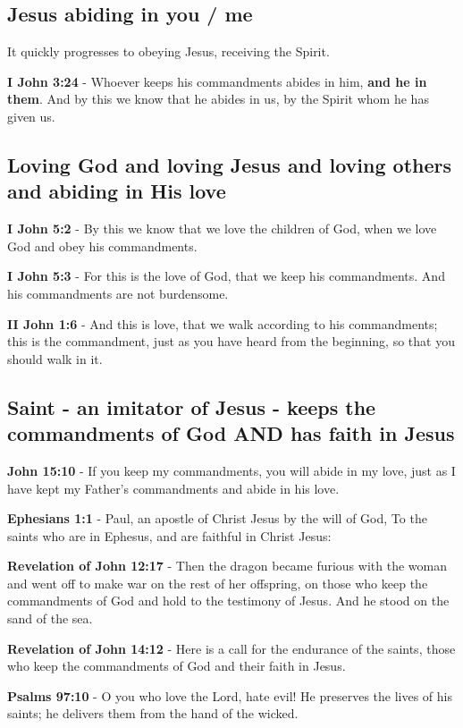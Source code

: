 \documentclass[11pt]{article}
\begin{document}
\subsection{Jesus abiding in \textbf{you} / \textbf{me}}
\label{sec:org439c29e}
It quickly progresses to obeying Jesus, receiving the Spirit.

\textbf{I John 3:24} - Whoever keeps his commandments abides in him, \textbf{and he in them}. And by this we know that he abides in us, by the Spirit whom he has given us.

\subsection{Loving God and loving Jesus and loving others and abiding in His love}
\label{sec:org26f8dac}
\textbf{I John 5:2} - By this we know that we love the children of God, when we love God and obey his commandments.

\textbf{I John 5:3} - For this is the love of God, that we keep his commandments. And his commandments are not burdensome.

\textbf{II John 1:6} - And this is love, that we walk according to his commandments; this is the commandment, just as you have heard from the beginning, so that you should walk in it.

\subsection{Saint - an imitator of Jesus - keeps the commandments of God AND has faith in Jesus}
\label{sec:orgfea124d}
\textbf{John 15:10} - If you keep my commandments, you will abide in my love, just as I have kept my Father's commandments and abide in his love.

\textbf{Ephesians 1:1} - Paul, an apostle of Christ Jesus by the will of God, To the saints who are in Ephesus, and are faithful in Christ Jesus:

\textbf{Revelation of John 12:17} - Then the dragon became furious with the woman and went off to make war on the rest of her offspring, on those who keep the commandments of God and hold to the testimony of Jesus. And he stood on the sand of the sea.

\textbf{Revelation of John 14:12} - Here is a call for the endurance of the saints, those who keep the commandments of God and their faith in Jesus.

\textbf{Psalms 97:10} - O you who love the Lord, hate evil! He preserves the lives of his saints; he delivers them from the hand of the wicked.
\end{document}
